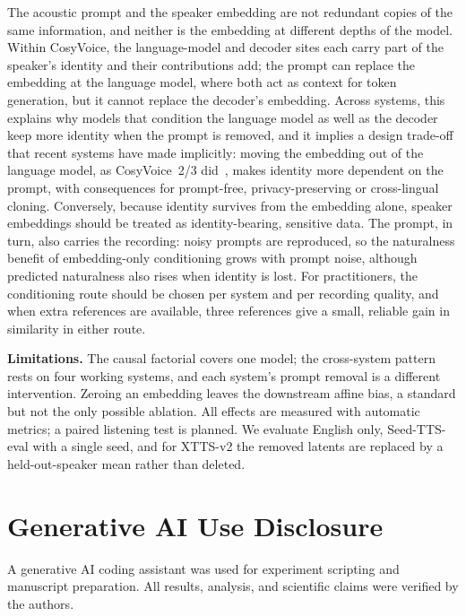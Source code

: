 \documentclass{Interspeech}
\begin{document}
The acoustic prompt and the speaker embedding are not redundant copies of the same information, and neither is the embedding at different depths of the model.
Within CosyVoice, the language-model and decoder sites each carry part of the speaker's identity and their contributions add; the prompt can replace the embedding at the language model, where both act as context for token generation, but it cannot replace the decoder's embedding.
Across systems, this explains why models that condition the language model as well as the decoder keep more identity when the prompt is removed, and it implies a design trade-off that recent systems have made implicitly: moving the embedding out of the language model, as CosyVoice~2/3 did~\cite{chen2026bottleneck}, makes identity more dependent on the prompt, with consequences for prompt-free, privacy-preserving or cross-lingual cloning.
Conversely, because identity survives from the embedding alone, speaker embeddings should be treated as identity-bearing, sensitive data.
The prompt, in turn, also carries the recording: noisy prompts are reproduced, so the naturalness benefit of embedding-only conditioning grows with prompt noise, although predicted naturalness also rises when identity is lost.
For practitioners, the conditioning route should be chosen per system and per recording quality, and when extra references are available, three references give a small, reliable gain in similarity in either route.

\textbf{Limitations.}
The causal factorial covers one model; the cross-system pattern rests on four working systems, and each system's prompt removal is a different intervention.
Zeroing an embedding leaves the downstream affine bias, a standard but not the only possible ablation.
All effects are measured with automatic metrics; a paired listening test is planned.
We evaluate English only, Seed-TTS-eval with a single seed, and for XTTS-v2 the removed latents are replaced by a held-out-speaker mean rather than deleted.

\section*{Generative AI Use Disclosure}
A generative AI coding assistant was used for experiment scripting and manuscript preparation.
All results, analysis, and scientific claims were verified by the authors.



\end{document}
